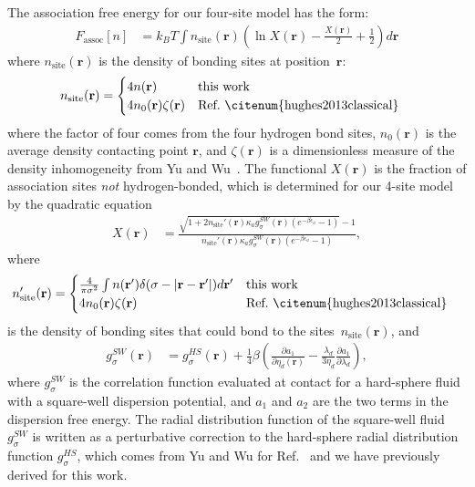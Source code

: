 \documentclass[twocolumn,amsmath,amssymb,prl]{revtex4-1}
\newcommand{\rr}{\textbf{r}}
\newcommand{\xx}{\textbf{r}}
\newcommand\etadisp{\ensuremath{\eta_\textit{d}}}
\newcommand\epsilonassoc{\ensuremath{\epsilon_\textit{a}}}
\newcommand\kappaassoc{\ensuremath{\kappa_\textit{a}}}
\newcommand\lambdadisp{\ensuremath{\lambda_\textit{d}}}
\begin{document}
The association free energy for our four-site model has the form:
\begin{align}
  F_\text{assoc}[n] &= k_BT \int n_\text{site}(\xx)
  \left(\ln X(\xx) - \frac{X(\xx)}{2} + \frac12\right) d\xx
\end{align}
where $n_\text{site}(\rr)$ is the density of bonding sites at
position~$\rr$:
\begin{align}
  n_\text{site}(\rr) &=
  \begin{cases}
    4 n(\rr) & \text{this work}\\
    4 n_0(\rr) \zeta(\rr) & \text{Ref.~\citenum{hughes2013classical}}
  \end{cases}
\end{align}
where the factor of four comes from the four hydrogen bond sites,
$n_0(\rr)$ is the average density contacting point $\rr$, and
$\zeta(\xx)$ is a dimensionless measure of the density inhomogeneity
from Yu and Wu~\cite{yu2002fmt-dft-inhomogeneous-associating}.  The
functional $X(\rr)$ is the fraction of association sites \emph{not}
hydrogen-bonded, which is determined for our 4-site model by the
quadratic equation
\begin{align}
  X(\xx) &= \frac{\sqrt{1 + 2n_\text{site}'(\rr)
      \kappaassoc g^\textit{SW}_\sigma(\xx)
  \left(e^{-\beta\epsilonassoc} - 1\right)} - 1}
  {n_\text{site}'(\rr)
    \kappaassoc g^\textit{SW}_\sigma(\xx)
  \left(e^{-\beta\epsilonassoc} - 1\right)}, \label{eq:X}
\end{align}
where
\begin{align}
  n_\text{site}'(\rr) &=
  \begin{cases}
    \frac{4}{\pi\sigma^2} \int n(\rr')\delta(\sigma - |\rr-\rr'|) d\rr' & \text{this work}\\
    4 n_0(\rr) \zeta(\rr) & \text{Ref.~\citenum{hughes2013classical}}
  \end{cases} 
\end{align}
is the density of bonding sites that could bond to the sites~$n_\text{site}(\rr)$, and
\begin{align}
  g^\textit{SW}_\sigma(\xx) &= g^\textit{HS}_\sigma(\xx) +
  \frac{1}{4}\beta\left(\frac{\partial a_1}{\partial \etadisp(\xx)} -
  \frac{\lambdadisp}{3 \etadisp}\frac{\partial a_1}{\partial \lambdadisp}\right)\label{eq:gSW},
\end{align}
where $g^\textit{SW}_\sigma$ is the correlation function evaluated at
contact for a hard-sphere fluid with a square-well dispersion
potential, and $a_1$ and $a_2$ are the two terms in the dispersion
free energy.  The radial distribution function of the square-well
fluid $g^\textit{SW}_\sigma$ is written as a perturbative correction
to the hard-sphere radial distribution function
$g^\textit{HS}_\sigma$, which comes from Yu and Wu
\cite{yu2002fmt-dft-inhomogeneous-associating} for
Ref.~ and we have previously
derived \cite{schulte2012using} for this work.
\end{document}
